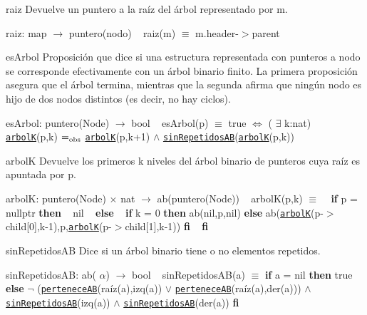 \begin{DoxyParagraph}{raiz}
Devuelve un puntero a la raíz del árbol representado por m.

raiz\+: map $\to$ puntero(nodo) ~\newline
 raiz(m) $\equiv$ m.\+header-\/$>$parent


\end{DoxyParagraph}
\begin{DoxyParagraph}{es\+Arbol}
Proposición que dice si una estructura representada con punteros a nodo se corresponde efectivamente con un árbol binario finito. La primera proposición asegura que el árbol termina, mientras que la segunda afirma que ningún nodo es hijo de dos nodos distintos (es decir, no hay ciclos).

es\+Arbol\+: puntero(\+Node) $\to$ bool ~\newline
 es\+Arbol(p) $\equiv$ true $\Leftrightarrow$ ( $\exists$ k\+:nat) \href{axiomas.html#arbolK}{\tt arbolK}(p,k) $=_{\rm obs}$ \href{axiomas.html#arbolK}{\tt arbolK}(p,k+1) $\land$ \href{axiomas.html#sinRepetidosAB}{\tt sin\+Repetidos\+AB}(\href{axiomas.html#arbolK}{\tt arbolK}(p,k))


\end{DoxyParagraph}
\begin{DoxyParagraph}{arbolK}
Devuelve los primeros k niveles del árbol binario de punteros cuya raíz es apuntada por p.

arbolK\+: puntero(\+Node) $\times$ nat $\to$ ab(puntero(\+Node)) ~\newline
 arbol\+K(p,k) $\equiv$ ~\newline
 {\bfseries if} p = nullptr {\bfseries then} ~\newline
 nil ~\newline
 {\bfseries else} ~\newline
 {\bfseries if} k = 0 {\bfseries then} ab(nil,p,nil) {\bfseries else} ab(\href{axiomas.html#arbolK}{\tt arbolK}(p-\/$>$child\mbox{[}0\mbox{]},k-\/1),p,\href{axiomas.html#arbolK}{\tt arbolK}(p-\/$>$child\mbox{[}1\mbox{]},k-\/1)) {\bfseries fi} ~\newline
 {\bfseries fi} 


\end{DoxyParagraph}
\begin{DoxyParagraph}{sin\+Repetidos\+AB}
Dice si un árbol binario tiene o no elementos repetidos.

sin\+Repetidos\+AB\+: ab( $\alpha$) $\to$ bool ~\newline
 sin\+Repetidos\+A\+B(a) $\equiv$ {\bfseries if} a = nil {\bfseries then} true {\bfseries else} $\lnot$ (\href{axiomas.html#perteneceAB}{\tt pertenece\+AB}(raíz(a),izq(a)) $\lor$ \href{axiomas.html#perteneceAB}{\tt pertenece\+AB}(raíz(a),der(a))) $\land$ \href{axiomas.html#sinRepetidosAB}{\tt sin\+Repetidos\+AB}(izq(a)) $\land$ \href{axiomas.html#sinRepetidosAB}{\tt sin\+Repetidos\+AB}(der(a)) {\bfseries fi} 


\end{DoxyParagraph}
